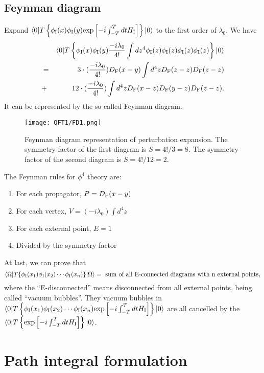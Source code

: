 \subsection{Feynman diagram}
Expand $\langle 0 | T \left\{ \phi_{\rm I}(x) \phi_{\rm I}(y) \mathrm{exp} \left[ -i \int_{-T}^{T} dt H_{\rm I} \right]\right\} | 0 \rangle$ to the first order of $\lambda_0$. We have
\begin{eqnarray}
& &\langle 0 | T \left\{ \phi_{\rm I}(x) \phi_{\rm I}(y) \frac{-i\lambda_0}{4!} \int dz^4 \phi_{\rm I}(z) \phi_{\rm I}(z) \phi_{\rm I}(z) \phi_{\rm I}(z) \right\} | 0 \rangle \nonumber \\
&=& 3 \cdot (\frac{-i\lambda_0}{4!}) D_{\rm F}(x-y) \int d^4 z D_{\rm F}(z-z) D_{\rm F}(z-z) \nonumber \\
&+& 12 \cdot (\frac{-i\lambda_0}{4!}) \int d^4 z  D_{\rm F}(x-z) D_{\rm F}(y-z) D_{\rm F}(z-z) .\nonumber
\end{eqnarray}
It can be represented by the so called Feynman diagram.
\begin{figure}[!h]
\centering
\texttt{[image: QFT1/FD1.png]}
\caption{Feynman diagram representation of perturbation expansion. The symmetry factor of the first diagram is $S = 4!/3 = 8$. The symmetry factor of the second diagram is $S = 4!/12 = 2$.}
\end{figure}
\noindent
The Feynman rules for $\phi^4$ theory are:
\begin{enumerate}
\item For each propagator, $P = D_{\rm F}(x-y)$
\item For each vertex, $V = (-i\lambda_0)\int d^4z$
\item For each external point, $E=1$
\item Divided by the symmetry factor
\end{enumerate}
At last, we can prove that
\[\langle \Omega | T \{ \phi_{\rm I}(x_1) \phi_{\rm I}(x_2) \cdots \phi_{\rm I}(x_n) \} | \Omega \rangle = \mbox{ sum of all E-connected diagrams with n external points},\]
where the ``E-disconnected'' means disconnected from all external points, being called ``vacuum bubbles''. They vacuum bubbles in $\langle 0 | T \left\{ \phi_{\rm I}(x_1) \phi_{\rm I}(x_2) \cdots \phi_{\rm I}(x_n) \mathrm{exp} \left[ -i \int_{-T}^{T} dt H_{\rm I} \right]\right\} | 0 \rangle$ are all cancelled by the $\langle 0 | T \left\{ \mathrm{exp} \left[ -i \int_{-T}^{T} dt H_{\rm I} \right]\right\} | 0 \rangle$.

\section{Path integral formulation}
